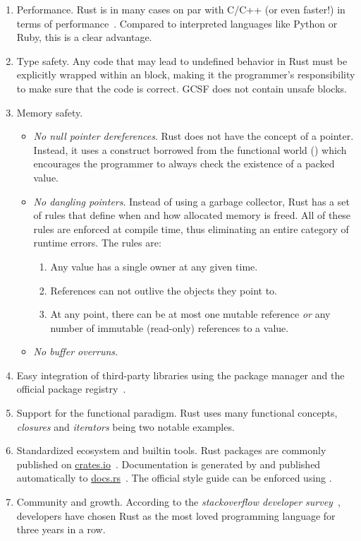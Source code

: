 \begin{enumerate}
  \itemsep0em
  \item Performance. Rust is in many cases on par with C/C++ (or even faster!) in terms of performance~\cite{rust_vs_cpp_benchmark}. Compared to interpreted languages like Python or Ruby, this is a clear advantage.
  \item Type safety. Any code that may lead to undefined behavior in Rust must be explicitly wrapped within an  block, making it the programmer's responsibility to make sure that the code is correct. GCSF does not contain unsafe blocks.
  \item Memory safety.
    \begin{itemize}
      \itemsep0em
      \item \emph{No null pointer dereferences}. Rust does not have the concept of a  pointer. Instead, it uses a construct borrowed from the functional world () which encourages the programmer to always check the existence of a packed value.
      \item \emph{No dangling pointers}. Instead of using a garbage collector, Rust has a set of rules that define when and how allocated memory is freed. All of these rules are enforced at compile time, thus eliminating an entire category of runtime errors. The rules are:
      \begin{enumerate}
        \itemsep0em
        \item Any value has a single owner at any given time.
        \item References can not outlive the objects they point to.
        \item At any point, there can be at most one mutable reference \emph{or} any number of immutable (read-only) references to a value.
      \end{enumerate}
      \item \emph{No buffer overruns.}
    \end{itemize}
  \item Easy integration of third-party libraries using the  package manager and the official package registry~\cite{crates_io}.
  \item Support for the functional paradigm. Rust uses many functional concepts, \emph{closures} and \emph{iterators} being two notable examples.
  \item Standardized ecosystem and builtin tools. Rust packages are commonly published on \url{crates.io}~\cite{crates_io}. Documentation is generated by  and published automatically to \url{docs.rs}~\cite{docs_rs}. The official style guide can be enforced using .
  \item Community and growth. According to the \emph{stackoverflow developer survey}~\cite{stack_overflow_most_loved}, developers have chosen Rust as the most loved programming language for three years in a row.
\end{enumerate}

